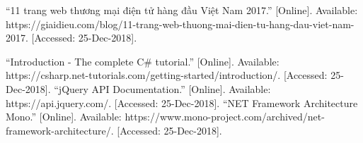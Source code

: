 \thispagestyle{plain}
\begin{thebibliography}{20}

“11 trang web thương mại điện tử hàng đầu Việt Nam 2017.” [Online]. Available: https://giaidieu.com/blog/11-trang-web-thuong-mai-dien-tu-hang-dau-viet-nam-2017. [Accessed: 25-Dec-2018].

“Introduction - The complete C\# tutorial.” [Online]. Available: https://csharp.net-tutorials.com/getting-started/introduction/. [Accessed: 25-Dec-2018].
“jQuery API Documentation.” [Online]. Available: https://api.jquery.com/. [Accessed: 25-Dec-2018].
“NET Framework Architecture Mono.” [Online]. Available: https://www.mono-project.com/archived/net-framework-architecture/. [Accessed: 25-Dec-2018].
\end{thebibliography}